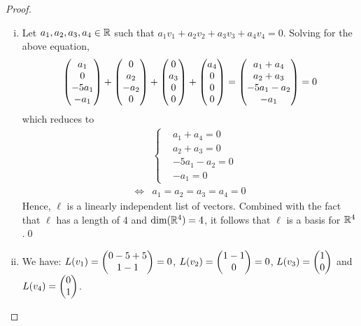 \begin{proof}
    \renewcommand{\qedsymbol}{$\blacksquare$}
    \begin{enumerate}[(i)]
        \item Let $a_1,a_2,a_3,a_4\in\mathbb R$ such that $a_1v_1+a_2v_2+a_3v_3+a_4v_4=0$.
        Solving for the above equation, 
        \[
            \begin{aligned}
                \begin{pmatrix} a_1\\ 0\\-5a_1 \\ -a_1\end{pmatrix}+\begin{pmatrix} 0\\ a_2\\-a_2 \\ 0\end{pmatrix}+\begin{pmatrix} 0\\ a_3\\0 \\ 0\end{pmatrix}+\begin{pmatrix} a_4\\ 0\\0 \\ 0\end{pmatrix}=\begin{pmatrix} a_1+a_4\\ a_2+a_3\\-5a_1-a_2 \\ -a_1\end{pmatrix}=0
            \end{aligned}
        \]
        which reduces to
        \begin{align*}
            &\begin{cases}
                &a_1+a_4=0\\
                &a_2+a_3=0\\
                &-5a_1-a_2=0\\
                &-a_1=0
            \end{cases}\\\iff
            &a_1=a_2=a_3=a_4=0
        \end{align*}
        Hence, $\ell$ is a linearly independent list of vectors. 
        Combined with the fact that $\ell$ has a length of 4 and $\textnormal{dim}(\mathbb R^4)=4$, it follows that $\ell$ is a basis for $\mathbb R^4$.\qed
        \item We have: $L(v_1)=\begin{pmatrix} 0-5+5\\ 1-1\end{pmatrix}=0$, $L(v_2)=\begin{pmatrix} 1-1\\ 0\end{pmatrix}=0$, $L(v_3)=\begin{pmatrix} 1\\ 0\end{pmatrix}$ and $L(v_4)=\begin{pmatrix} 0\\ 1\end{pmatrix}$.
    \end{enumerate}
    \renewcommand{\qedsymbol}{}
\end{proof}